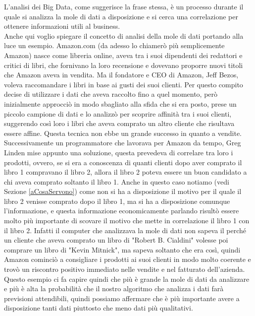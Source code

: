 L'analisi dei Big Data, come suggerisce la frase stessa, \`e un processo durante il quale si analizza la mole di dati a disposizione e si cerca una correlazione per ottenere informazioni utili al business.\\
Anche qui voglio spiegare il concetto di analisi della mole di dati portando alla luce un esempio. Amazon.com (da adesso lo chiamer\`o pi\`u semplicemente Amazon) nasce come libreria online, aveva tra i suoi dipendenti dei redattori e critici di libri, che fornivano la loro recensione e dovevano proporre nuovi titoli che Amazon aveva in vendita. Ma il fondatore e CEO di Amazon, Jeff Bezos, voleva raccomandare i libri in base ai gusti dei suoi clienti. Per questo compito decise di utilizzare i dati che aveva raccolto fino a quel momento, per\`o inizialmente approcci\`o in modo sbagliato alla sfida che si era posto, prese un piccolo campione di dati e lo analizz\`o per scoprire affinit\`a tra i suoi clienti, suggerendo cos\`i loro i libri che aveva comprato un altro cliente che risultava essere affine. Questa tecnica non ebbe un grande successo in quanto a vendite. Successivamente un programmatore che lavorava per Amazon da tempo, Greg Linden mise appunto una soluzione, questa prevedeva di correlare tra loro i prodotti, ovvero, se si era a conoscenza di quanti clienti dopo aver comprato il libro 1 compravano il libro 2, allora il libro 2 poteva essere un buon candidato a chi aveva comprato soltanto il libro 1. Anche in questo caso notiamo (vedi Sezione \ref{aCosaServono}) come non si ha a disposizione il motivo per il quale il libro 2 venisse comprato dopo il libro 1, ma si ha a disposizione comunque l'informazione, e questa informazione economicamente parlando risult\`o essere molto pi\`u importante di scovare il motivo che mette in correlazione il libro 1 con il libro 2. Infatti il computer che analizzava la mole di dati non sapeva il perch\'e un cliente che aveva comprato un libro di "Robert B. Cialdini" volesse poi comprare un libro di "Kevin Mitnick", ma sapeva soltanto che era cos\`i, quindi Amazon cominci\`o a consigliare i prodotti ai suoi clienti in modo molto coerente e trov\`o un riscontro positivo immediato nelle vendite e nel fatturato dell'azienda.\\
Questo esempio ci fa capire quindi che pi\`u \`e grande la mole di dati da analizzare e pi\`u \`e alta la probabilit\`a che il nostro algoritmo che analizza i dati far\`a previsioni attendibili, quindi possiamo affermare che \`e pi\`u importante avere a disposizione tanti dati piuttosto che meno dati pi\`u qualitativi. \cite{bigData}


